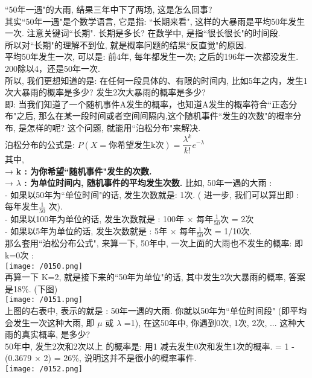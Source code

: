 \documentclass[UTF8]{ctexart}
\begin{document}
	\begin{myEnvSample}
		``50年一遇"的大雨, 结果三年中下了两场, 这是怎么回事? \\
		其实``50年一遇"是个数学语言, 它是指: ``长期来看", 这样的大暴雨是平均50年发生一次. 注意关键词``长期". 长期是多长? 在数学中, 是指``很长很长"的时间段. \\
		所以对``长期"的理解不到位, 就是概率问题的结果``反直觉"的原因. \\
		
		平均50年发生一次, 可以是:  前4年, 每年都发生一次; 之后的196年一次都没发生. 200除以4，还是50年一次. \\
		
		所以, 我们更想知道的是: 在任何一段具体的、有限的时间内, 比如5年之内，发生1次大暴雨的概率是多少? 发生2次大暴雨的概率是多少? \\
		
		即: 当我们知道了一个随机事件A发生的概率，也知道A发生的概率符合``正态分布"之后, 那么在某一段时间或者空间间隔内,这个随机事件``发生的次数"的概率分布, 是怎样的呢? 这个问题, 就能用``泊松分布"来解决. \\
		
		泊松分布的公式是: 	$ \boxed{
		P(X=\text{你希望发生k次})=\dfrac{\lambda^k} {k!} e^{-\lambda}}$	 \\
		其中, \\
		→ \textbf{k : 为你希望``随机事件"发生的次数.} \\
		→ \textbf{$\lambda$ : 为单位时间内, 随机事件的平均发生次数.} 比如, 50年一遇的大雨 : \\
		- 如果以50年为``单位时间"的话, 发生次数就是: 1次.  ( 进一步, 我们可以算出即 : 每年发生$\frac{1} {50}$ 次).  \\
		- 如果以100年为单位的话, 发生次数就是 : 100年 ×  每年$\frac{1} {50}$次 = 2次  \\
		- 如果以5年为单位的话, 发生次数就是 :  5年 ×  每年$\frac{1} {50}$次 = 1/10次. \\ 
		
		那么套用``泊松分布公式", 来算一下, 50年中, 一次上面的大雨也不发生的概率: 即 k=0次 : \\
		
		\texttt{[image: /0150.png]} \\
		
		再算一下 K=2, 就是接下来的``50年为单位"的话, 其中发生2次大暴雨的概率, 答案是18\%. (下图) \\
		
		\texttt{[image: /0151.png]} \\	
		
		上图的右表中, 表示的就是 :  50年一遇的大雨. 你就以50年为``单位时间段" (即平均会发生一次这种大雨, 即 $\mu$ 或 $\lambda$ =1), 在这50年中, 你遇到0次, 1次, 2次, ...​ 这种大雨的真实概率, 是多少? \\
		
		50年中, 发生2次和2次以上 的概率是: 用1 减去发生0次和发生1次的概率. = 1 - (0.3679 × 2) = 26\%, 说明这并不是很小的概率事件. \\
		
		\texttt{[image: /0152.png]} 
	\end{myEnvSample}
	\vspace{1em} 
	
\end{document}
